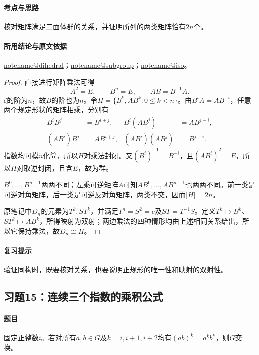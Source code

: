 \documentclass[UTF8,a4paper,11pt,fontset=windows]{ctexart}
\makeatletter
\newcommand{\noteref}[1]{\hyperref[note:#1]{\csname notename@#1\endcsname}}
\newcommand{\exref}[2]{\hyperref[ex:#1:#2]{第#1章习题#2}}
\makeatother
\begin{document}
\paragraph{考点与思路}
核对矩阵满足二面体群的关系，并证明所列的两类矩阵恰有$2n$个。

\paragraph{所用结论与原文依据}
\noteref{dihedral}；\noteref{subgroup}；\noteref{iso}。


\begin{proof}
直接进行矩阵乘法可得
\[
A^2=E,\qquad B^n=E,\qquad AB=B^{-1}A.
\]
$\zeta$的阶为$n$，故$B$的阶也为$n$。令$H=\{B^k,AB^k:0\leq k<n\}$。由$B^iA=AB^{-i}$，任意两个规定形状的矩阵相乘，分别有
\begin{align*}
B^iB^j&=B^{i+j},& B^i(AB^j)&=AB^{j-i},\\
(AB^i)B^j&=AB^{i+j},&(AB^i)(AB^j)&=B^{j-i}.
\end{align*}
指数均可模$n$化简，所以$H$对乘法封闭。又$(B^i)^{-1}=B^{-i}$，且$(AB^i)^2=E$，所以$H$对取逆封闭，且含$E$，故为群。

$B^0,\ldots,B^{n-1}$两两不同；左乘可逆矩阵$A$可知$AB^0,\ldots,AB^{n-1}$也两两不同。前一类是可逆对角矩阵，后一类是可逆反对角矩阵，两类不交，因而$|H|=2n$。

原笔记中$D_n$的元素为$T^k,ST^k$，并满足$T^n=S^2=e$及$ST=T^{-1}S$。定义$T^k\mapsto B^k$、$ST^k\mapsto AB^k$，所得映射为双射；两边乘法的四种情形均由上述相同关系给出，所以它保持乘法，故$D_n\cong H$。
\end{proof}

\paragraph{复习提示}
验证同构时，既要核对关系，也要说明正规形的唯一性和映射的双射性。


\subsection{习题15：\texorpdfstring{连续三个指数的乘积公式}{连续三个指数的乘积公式}}
\label{ex:1:15}

\paragraph{题目}
固定正整数$i$。若对所有$a,b\in G$及$k=i,i+1,i+2$均有$(ab)^k=a^kb^k$，则$G$交换。
\end{document}
